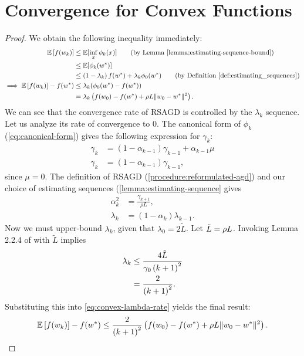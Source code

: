 \section{Convergence for Convex Functions}\label{app:agd-convex}

\convexAGD*
\begin{proof}
    We obtain the following inequality immediately:
    \begin{align}
        \E\sbr{f(\wk)} &\leq \E[\inf_x \phi_k(x)] \tag{by Lemma~\ref{lemma:estimating-sequence-bound}} \nonumber\\
        &\leq \E[\phi_k(\wopt)] \nonumber \\
        &\leq \rbr{1 - \lambda_k} f(\wopt) + \lambda_k \phi_0(\wopt) \tag{by Definition~\ref{def:estimating_sequences}} \nonumber\\
        \implies \E\sbr{f(\wk)} - f(\wopt) &\leq \lambda_k (\phi_0(\wopt) - f(\wopt)) \nonumber\\
                                           &= \lambda_k \rbr{f(\w_0) - f(\wopt) + \sgc L \norm{\w_0 - \wopt}^2 } \label{eq:convex-lambda-rate}.
    \end{align}
    We can see that the convergence rate of \ac{RSAGD} is controlled by the \( \lambda_k \) sequence.
    Let us analyze its rate of convergence to \( 0 \).
    The canonical form of \( \phi_k \) (\autoref{eq:canonical-form}) gives the following expression for \( \gamma_k \): 
    \begin{align*}
        \gamma_{k} &= (1 - \alpha_{k-1}) \gamma_{k-1} + \alpha_{k-1} \mu\\
        \gamma_{k} &= (1 - \alpha_{k-1}) \gamma_{k-1}, 
    \end{align*}
    since \( \mu = 0 \).
    The definition of \ac{RSAGD} (\autoref{procedure:reformulated-agd}) and our choice of estimating sequences (\autoref{lemma:estimating-sequence} gives 
    \begin{align*}
        \alpha_k^2 &= \frac{\gamma_{k+1}}{\rho L},\\
        \lambda_k & = (1 - \alpha_k) \lambda_{k-1}. 
    \end{align*}
    Now we must upper-bound \( \lambda_k \), given that \( \lambda_0 = 2 \tilde L \).
    Let \( \tilde L = \rho L \). 
    Invoking Lemma 2.2.4 of \citet{nesterov2004lectures} with \( \tilde L \) implies 
    \begin{align*}
        \lambda_k &\leq \frac{4 \tilde L}{\gamma_0 \left(k + 1\right)^2}\\ 
                  &= \frac{2}{\left(k + 1\right)^2}.
    \end{align*}
    Substituting this into \autoref{eq:convex-lambda-rate} yields the final result: 
    \[  \mathbb{E}\left[f(w_k)\right] - f(w^*) \leq \frac{2}{\left(k+1\right)^2}\left(f(w_0) - f(w^*) + \rho L \|w_0 - w^*\|^2 \right). \]
\end{proof}


